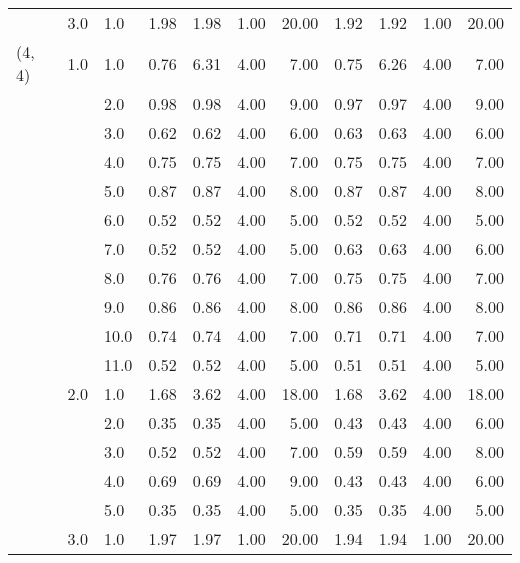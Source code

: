 \begin{tabular}{lllrrrrrrrr}
       & 3.0 & 1.0  &       1.98 &      1.98 & 1.00 &  20.00 &       1.92 &      1.92 & 1.00 &  20.00 \\
(4, 4) & 1.0 & 1.0  &       0.76 &      6.31 & 4.00 &   7.00 &       0.75 &      6.26 & 4.00 &   7.00 \\
       &     & 2.0  &       0.98 &      0.98 & 4.00 &   9.00 &       0.97 &      0.97 & 4.00 &   9.00 \\
       &     & 3.0  &       0.62 &      0.62 & 4.00 &   6.00 &       0.63 &      0.63 & 4.00 &   6.00 \\
       &     & 4.0  &       0.75 &      0.75 & 4.00 &   7.00 &       0.75 &      0.75 & 4.00 &   7.00 \\
       &     & 5.0  &       0.87 &      0.87 & 4.00 &   8.00 &       0.87 &      0.87 & 4.00 &   8.00 \\
       &     & 6.0  &       0.52 &      0.52 & 4.00 &   5.00 &       0.52 &      0.52 & 4.00 &   5.00 \\
       &     & 7.0  &       0.52 &      0.52 & 4.00 &   5.00 &       0.63 &      0.63 & 4.00 &   6.00 \\
       &     & 8.0  &       0.76 &      0.76 & 4.00 &   7.00 &       0.75 &      0.75 & 4.00 &   7.00 \\
       &     & 9.0  &       0.86 &      0.86 & 4.00 &   8.00 &       0.86 &      0.86 & 4.00 &   8.00 \\
       &     & 10.0 &       0.74 &      0.74 & 4.00 &   7.00 &       0.71 &      0.71 & 4.00 &   7.00 \\
       &     & 11.0 &       0.52 &      0.52 & 4.00 &   5.00 &       0.51 &      0.51 & 4.00 &   5.00 \\
       & 2.0 & 1.0  &       1.68 &      3.62 & 4.00 &  18.00 &       1.68 &      3.62 & 4.00 &  18.00 \\
       &     & 2.0  &       0.35 &      0.35 & 4.00 &   5.00 &       0.43 &      0.43 & 4.00 &   6.00 \\
       &     & 3.0  &       0.52 &      0.52 & 4.00 &   7.00 &       0.59 &      0.59 & 4.00 &   8.00 \\
       &     & 4.0  &       0.69 &      0.69 & 4.00 &   9.00 &       0.43 &      0.43 & 4.00 &   6.00 \\
       &     & 5.0  &       0.35 &      0.35 & 4.00 &   5.00 &       0.35 &      0.35 & 4.00 &   5.00 \\
       & 3.0 & 1.0  &       1.97 &      1.97 & 1.00 &  20.00 &       1.94 &      1.94 & 1.00 &  20.00 \\

\end{tabular}

